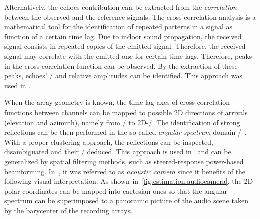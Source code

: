 \mynewline
Alternatively, the echoes contribution can be extracted from the \textit{correlation} between the observed and the reference signals.
The cross-correlation analysis is a mathematical tool for the identification of repeated patterns in a signal as function of a certain time lag.
Due to indoor sound propagation, the received signal consists in repeated copies of the emitted signal.
Therefore, the received signal may correlate with the emitted one for certain time lags.
Therefore, peaks in the cross-correlation function can be observed.
By the extraction of these peaks, echoes' \TOAs/ and relative amplitudes can be identified.
This approach was used in .

When the array geometry is known, the time lag axes of cross-correlation functions between channels can be mapped to possible 2D directions of arrivals (elevation and azimuth), namely from \TOAs/ to 2D-\DOAs/.
The identification of strong reflections can be then performed in the so-called \textit{angular spectrum} domain \DOAs/~.
With a proper clustering approach, the reflections can be inspected, disambiguated and their \TOAs/ deduced.
This approach is used in~ and can be generalized by spatial filtering methods, such as steered-response power-based beamforming.
In~, it was referred to as \textit{acoustic camera} since it benefits of the following visual interpretation:
As shown in~\cref{fig:estimation:audiocamera}, the 2D-polar coordinates can be mapped into cartesian ones so that the angular spectrum can be superimposed to a panoramic picture of the audio scene taken by the barycenter of the recording arrays.

